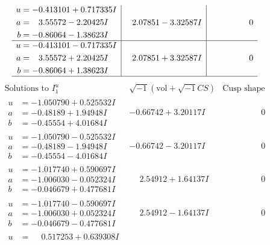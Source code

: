 \documentclass[1p]{elsarticle_modified}
\theoremstyle{definition}
\newcommand{\I}{\sqrt{-1}}
\begin{document}
$$\begin{array}{c|c|c}
\begin{aligned}
u &= -0.413101 + 0.717335 I \\
a &= \phantom{-}3.55572 - 2.20425 I \\
b &= -0.86064 - 1.38623 I\end{aligned}
 & \phantom{-}2.07851 - 3.32587 I & \phantom{-0.000000 } 0 \\ \hline\begin{aligned}
u &= -0.413101 - 0.717335 I \\
a &= \phantom{-}3.55572 + 2.20425 I \\
b &= -0.86064 + 1.38623 I\end{aligned}
 & \phantom{-}2.07851 + 3.32587 I & \phantom{-0.000000 } 0\\
 \hline 
 \end{array}$$\newpage$$\begin{array}{c|c|c}  
\text{Solutions to }I^u_{1}& \I (\text{vol} + \sqrt{-1}CS) & \text{Cusp shape}\\
 \hline 
\begin{aligned}
u &= -1.050790 + 0.525532 I \\
a &= -0.48189 + 1.94948 I \\
b &= -0.45554 + 4.01684 I\end{aligned}
 & -0.66742 + 3.20117 I & \phantom{-0.000000 } 0 \\ \hline\begin{aligned}
u &= -1.050790 - 0.525532 I \\
a &= -0.48189 - 1.94948 I \\
b &= -0.45554 - 4.01684 I\end{aligned}
 & -0.66742 - 3.20117 I & \phantom{-0.000000 } 0 \\ \hline\begin{aligned}
u &= -1.017740 + 0.590697 I \\
a &= -1.006030 - 0.052324 I \\
b &= -0.046679 + 0.477681 I\end{aligned}
 & \phantom{-}2.54912 + 1.64137 I & \phantom{-0.000000 } 0 \\ \hline\begin{aligned}
u &= -1.017740 - 0.590697 I \\
a &= -1.006030 + 0.052324 I \\
b &= -0.046679 - 0.477681 I\end{aligned}
 & \phantom{-}2.54912 - 1.64137 I & \phantom{-0.000000 } 0 \\ \hline\begin{aligned}
u &= \phantom{-}0.517253 + 0.639308 I \\

\end{aligned}
\end{array}$$
\end{document}
